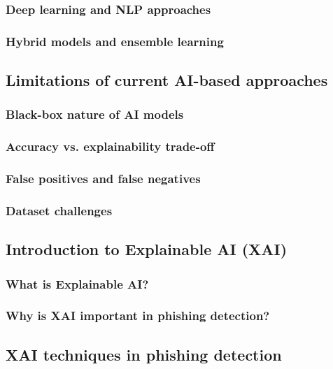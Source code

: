 \subsubsection*{Deep learning and NLP approaches}

\subsubsection*{Hybrid models and ensemble learning}

\subsection*{Limitations of current AI-based approaches}

\subsubsection*{Black-box nature of AI models}

\subsubsection*{Accuracy vs. explainability trade-off}

\subsubsection*{False positives and false negatives}

\subsubsection*{Dataset challenges}

\subsection*{Introduction to Explainable AI (XAI)}

\subsubsection*{What is Explainable AI?}

\subsubsection*{Why is XAI important in phishing detection?}

\subsection*{XAI techniques in phishing detection}

